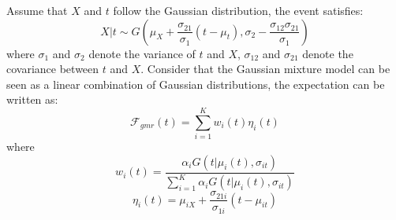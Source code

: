 \documentclass[conference]{IEEEtran}
\begin{document}
Assume that $X$ and $t$ follow the Gaussian distribution, the event satisfies:
\begin{equation}
    X|t \sim G(\mu_X+\frac{\sigma_{21}}{\sigma_{1}}(t-\mu_t),\sigma_{2}-\frac{\sigma_{12}\sigma_{21}}{\sigma_{1}})
\end{equation}
where $\sigma_{1}$ and $\sigma_{2}$ denote the variance of $t$ and $X$, $\sigma_{12}$ and $\sigma_{21}$ denote the covariance between $t$ and $X$. Consider that the Gaussian mixture model can be seen as a linear combination of Gaussian distributions, the expectation can be written as:
\begin{equation}
    \mathcal{F} _{gmr}(t)=\sum\limits_{i=1}^{K}w_i(t)\eta_i(t)
\end{equation}
where
\begin{equation}
    w_i(t)=\frac{\alpha_{i}G(t|\mu_{i}(t),\sigma_{it})}{\sum_{i=1}^{K}\alpha_{i}G(t|\mu_{i}(t),\sigma_{it})}
\end{equation}
\begin{equation}
    \eta_i(t)=\mu_{iX}+\frac{\sigma_{21i}}{\sigma_{1i}}(t-\mu_{it})
    \label{eq2}
\end{equation}
\end{document}
